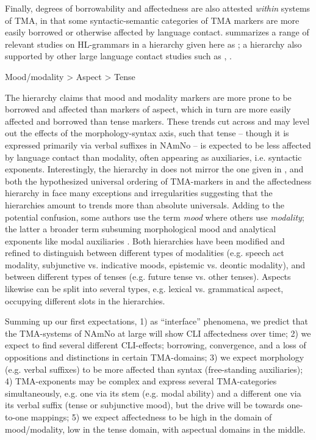 \documentclass[output=paper]{langscibook}
\begin{document}
Finally, degrees of borrowability and affectedness are also attested \textit{within} systems of TMA, in that some syntactic-semantic categories of TMA markers are more easily borrowed or otherwise affected by language contact. \citet[71]{Montrul2016} summarizes a range of relevant studies on HL-grammars in a hierarchy given here as ; a hierarchy also supported by other large language contact studies such as \citet{MatrasSakel2007}, \citet[45]{Matras2007}. 

\ea\label{ex:eide:3} Mood/modality > Aspect > Tense\z

The hierarchy claims that mood and modality markers are more prone to be borrowed and affected than markers of aspect, which in turn are more easily affected and borrowed than tense markers. These trends cut across and may level out the effects of the morphology-syntax axis, such that tense – though it is expressed primarily via verbal suffixes in NAmNo – is expected to be less affected by language contact than modality, often appearing as auxiliaries, i.e. syntactic exponents. Interestingly, the hierarchy in  does not mirror the one given in , and both the hypothesized universal ordering of TMA-markers in  and the affectedness hierarchy in  face many exceptions and irregularities suggesting that the hierarchies amount to trends more than absolute universals. Adding to the potential confusion, some authors use the term \textit{mood} where others use \textit{modality}; the latter a broader term subsuming morphological mood and analytical exponents like modal auxiliaries \citep[78]{Cinque1999}. Both hierarchies have been modified and refined to distinguish between different types of modalities (e.g. speech act modality, subjunctive vs. indicative moods, epistemic vs. deontic modality), and between different types of tenses (e.g. future tense vs. other tenses). Aspects likewise can be split into several types, e.g. lexical vs. grammatical aspect, occupying different slots in the hierarchies. 

Summing up our first expectations, 1) as “interface” phenomena, we predict that the TMA-systems of NAmNo at large will show CLI affectedness over time; 2) we expect to find several different CLI-effects; borrowing, convergence, and a loss of oppositions and distinctions in certain TMA-domains; 3) we expect morphology (e.g. verbal suffixes) to be more affected than syntax (free-standing auxiliaries); 4) TMA-exponents may be complex and express several TMA-categories simultaneously, e.g. one via its stem (e.g. modal ability) and a different one via its verbal suffix (tense or subjunctive mood), but the drive will be towards one-to-one mappings; 5) we expect affectedness to be high in the domain of mood\slash modality, low in the tense domain, with aspectual domains in the middle.
\end{document}
